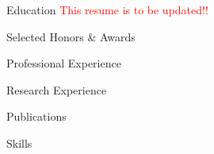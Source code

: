 \documentclass[11pt]{resume}
\begin{document}
\begin{rSection}{Education}
      \textcolor{red}{This resume is to be updated!!}

\end{rSection}

\begin{rSection}{Selected Honors \& Awards}
\end{rSection}

\begin{rSection}{Professional Experience}
\end{rSection}

\begin{rSection}{Research Experience}
\end{rSection}

\begin{rSection}{Publications}
\end{rSection}

\begin{rSection}{Skills}
\end{rSection}
\end{document}
